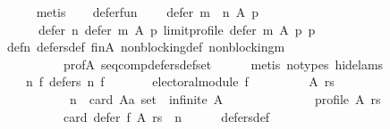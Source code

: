 \begin{isabellebody}
\ \ \ \ \isamarkupfalse%
\ metis\isanewline
\ \ \isamarkupfalse%
\ defer{\isacharunderscore}{\kern0pt}fun{\isacharcolon}{\kern0pt}\isanewline
\ \ \ \ {\isachardoublequoteopen}defer\ {\isacharparenleft}{\kern0pt}m\ {\isasymtriangleright}\ n{\isacharparenright}{\kern0pt}\ A\ p\ {\isacharequal}{\kern0pt}\isanewline
\ \ \ \ \ \ defer\ n\ {\isacharparenleft}{\kern0pt}defer\ m\ A\ p{\isacharparenright}{\kern0pt}\ {\isacharparenleft}{\kern0pt}limit{\isacharunderscore}{\kern0pt}profile\ {\isacharparenleft}{\kern0pt}defer\ m\ A\ p{\isacharparenright}{\kern0pt}\ p{\isacharparenright}{\kern0pt}{\isachardoublequoteclose}\isanewline
\ \ \ \ \isamarkupfalse%
\ def{\isacharunderscore}{\kern0pt}{}{\isacharunderscore}{\kern0pt}n\ defers{\isacharunderscore}{\kern0pt}def\ fin{\isacharunderscore}{\kern0pt}A\ non{\isacharunderscore}{\kern0pt}blocking{\isacharunderscore}{\kern0pt}def\ non{\isacharunderscore}{\kern0pt}blocking{\isacharunderscore}{\kern0pt}m\isanewline
\ \ \ \ \ \ \ \ \ \ prof{\isacharunderscore}{\kern0pt}A\ seq{\isacharunderscore}{\kern0pt}comp{\isacharunderscore}{\kern0pt}defers{\isacharunderscore}{\kern0pt}def{\isacharunderscore}{\kern0pt}set\isanewline
\ \ \ \ \isamarkupfalse%
\ {\isacharparenleft}{\kern0pt}metis\ {\isacharparenleft}{\kern0pt}no{\isacharunderscore}{\kern0pt}types{\isacharcomma}{\kern0pt}\ hide{\isacharunderscore}{\kern0pt}lams{\isacharparenright}{\kern0pt}{\isacharparenright}{\kern0pt}\isanewline
\ \ \isamarkupfalse%
\isanewline
\ \ \ \ {\isachardoublequoteopen}{\isasymforall}n\ f{\isachardot}{\kern0pt}\ defers\ n\ f\ {\isacharequal}{\kern0pt}\isanewline
\ \ \ \ \ \ {\isacharparenleft}{\kern0pt}electoral{\isacharunderscore}{\kern0pt}module\ f\ {\isasymand}\isanewline
\ \ \ \ \ \ \ \ {\isacharparenleft}{\kern0pt}{\isasymforall}A\ rs{\isachardot}{\kern0pt}\isanewline
\ \ \ \ \ \ \ \ \ \ {\isacharparenleft}{\kern0pt}{\isasymnot}\ n\ {\isasymle}\ card\ {\isacharparenleft}{\kern0pt}A{\isacharcolon}{\kern0pt}{\isacharcolon}{\kern0pt}{\isacharprime}{\kern0pt}a\ set{\isacharparenright}{\kern0pt}\ {\isasymor}\ infinite\ A\ {\isasymor}\isanewline
\ \ \ \ \ \ \ \ \ \ \ \ {\isasymnot}\ profile\ A\ rs{\isacharparenright}{\kern0pt}\ {\isasymor}\isanewline
\ \ \ \ \ \ \ \ \ \ card\ {\isacharparenleft}{\kern0pt}defer\ f\ A\ rs{\isacharparenright}{\kern0pt}\ {\isacharequal}{\kern0pt}\ n{\isacharparenright}{\kern0pt}{\isacharparenright}{\kern0pt}{\isachardoublequoteclose}\isanewline
\ \ \ \ \isamarkupfalse%
\ defers{\isacharunderscore}{\kern0pt}def\isanewline

\end{isabellebody}
